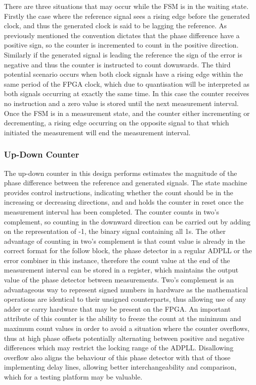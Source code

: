 There are three situations that may occur while the \ac{FSM} is in the waiting state. Firstly the case where the reference signal sees a rising edge before the generated clock, and thus the generated clock is said to be lagging the reference. As previously mentioned the convention dictates that the phase difference have a positive sign, so the counter is incremented to count in the positive direction. Similarly if the generated signal is leading the reference the sign of the error is negative and thus the counter is instructed to count downwards. The third potential scenario occurs when both clock signals have a rising edge within the same period of the \ac{FPGA} clock, which due to quantisation will be interpreted as both signals occurring at exactly the same time. In this case the counter receives no instruction and a zero value is stored until the next measurement interval. Once the \ac{FSM} is in a measurement state, and the counter either incrementing or decrementing, a rising edge occurring on the opposite signal to that which initiated the measurement will end the measurement interval.


\subsubsection{Up-Down Counter}
The up-down counter in this design performs estimates the magnitude of the phase difference between the reference and generated signals. The state machine provides control instructions, indicating whether the count should be in the increasing or decreasing directions, and and holds the counter in reset once the measurement interval has been completed. The counter counts in two's complement, so counting in the downward direction can be carried out by adding on the representation of -1, the binary signal containing all 1s. The other advantage of counting in two's complement is that count value is already in the correct format for the follow block, the phase detector in a regular \ac{ADPLL} or the error combiner in this instance, therefore the count value at the end of the measurement interval can be stored in a register, which maintains the output value of the phase detector between measurements. Two's complement is an advantageous way to represent signed numbers in hardware as the mathematical operations are identical to their unsigned counterparts, thus allowing use of any adder or carry hardware that may be present on the \ac{FPGA}. An important attribute of this counter is the ability to freeze the count at the minimum and maximum count values in order to avoid a situation where the counter overflows, thus at high phase offsets potentially alternating between positive and negative differences which may restrict the locking range of the \ac{ADPLL}. Disallowing overflow also aligns the behaviour of this phase detector with that of those implementing delay lines, allowing better interchangeability and comparison, which for a testing platform may be valuable.

